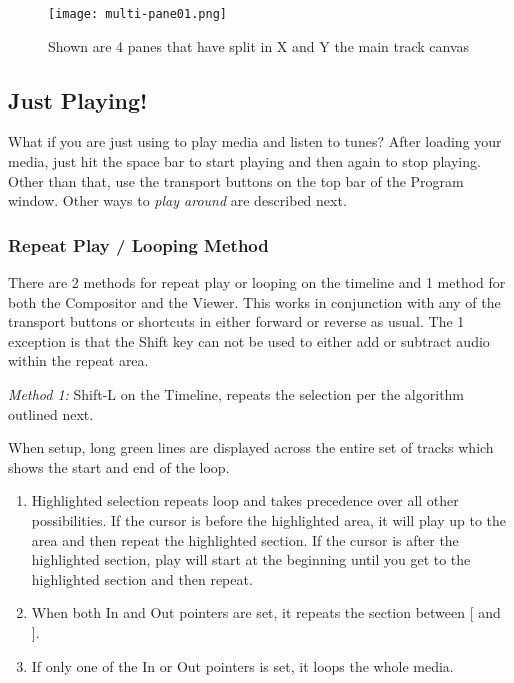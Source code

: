\begin{figure}[htpb]
	\centering
	\texttt{[image: multi-pane01.png]}
	\caption{Shown are 4 panes that have split in X and Y the main track canvas}
	\label{fig:multi-pane01}
\end{figure}


\subsection{Just Playing!}%
\label{sub:just_playing_}
What if you are just using \CGG{} to play media and listen to tunes? 
After loading your media, just hit the space bar to start playing and then again to stop playing.  
Other than that, use the transport buttons on the top bar of the Program window.  
Other ways to \textit{play around} are described next. 

\subsubsection*{Repeat Play / Looping Method}%
\label{ssub:repeat_play_looping_method}

There are 2 methods for repeat play or looping on the timeline and 1 method for both the Compositor and the Viewer.  This works in conjunction with any of the transport buttons or shortcuts in either forward or reverse as usual.  The 1 exception is that the Shift key can not be used to either add or subtract audio within the repeat area.

\textit{Method 1:} Shift-L on the Timeline, repeats the selection per the algorithm outlined next.
  
When setup, long green lines are displayed across the entire set of tracks which shows the start and end of the loop.
\begin{enumerate}
    \item  Highlighted selection repeats loop and takes precedence over all other possibilities.  
        If the cursor is before the highlighted area, it will play up to the area and then repeat the highlighted section.  
        If the cursor is after the highlighted section, play will start at the beginning until you get to the
        highlighted section and then repeat.
    \item  When both In and Out pointers are set, it repeats the section between [ and ].
    \item  If only one of the In or Out pointers is set, it loops the whole media.
\end{enumerate}

